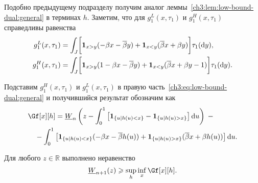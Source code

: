 {Подобно предыдущему подразделу получим аналог леммы~\ref{ch3:lem:low-bound-dual:general} в терминах $h$.
Заметим, что для $g_1^L(x, \tau_1)$ и $g_1^H(x, \tau_1)$ справедливы равенства
\begin{align*}
  g_1^L(x,\tau_1) &=
                      \int_J \biggl[
                      \mathbf{1}_{x>y} (-\beta x - {{\overline{\beta}}} y) +
                      \mathbf{1}_{x<y} ({{\overline{\beta}}} x + \beta y)
                      \biggr] \tau_1(\mathop{}\!\mathrm{d} y),\\
  g_1^H(x,\tau_1) &=
                      \int_J \biggl[
                      \mathbf{1}_{x>y} (1 -\beta x - {{\overline{\beta}}} y) +
                      \mathbf{1}_{x<y} ({{\overline{\beta}}} x + \beta y - 1)
                      \biggr] \tau_1(\mathop{}\!\mathrm{d} y).
\end{align*}

Подставим $g_1^H(x, \tau_1)$ и $g_1^L(x,\tau_1)$ в правую часть~\eqref{ch3:eq:low-bound-dual:general} и получившийся результат обозначим как
\begin{equation}\label{eq:W-low-bound:parameterized}
\begin{multlined}
  \Gf[x][h] =
  \LW{n}\left( 
    z - \int_0^1 \left[ \Ind{\{u | h(u) < x\}} - \Ind{\{u | h(u) > x\}} \right] \di u
  \right) \; - \\
  - \int_0^1 \left[ 
    \Ind{\{u | h(u) < x\}} (-\Co x - \DCo h(u)) + 
    \Ind{\{u | h(u) > x\}} (\DCo x + \Co h(u)) 
  \right] \di u.
\end{multlined}
\end{equation}

\begin{lemma}\label{ch3:lem:W-low-bound:parameterized}
  Для любого $z \in \mathbb{R}$ выполнено неравенство
  \begin{equation*}
    \LW{n+1}(z) \geqslant \sup_h \inf_{x} \Gf[x][h].
  \end{equation*}
\end{lemma}

}
